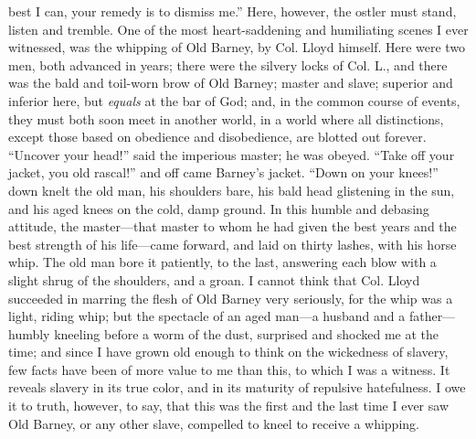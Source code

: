 best I can, your remedy is to dismiss me.'' Here, however, the ostler
must stand, listen and tremble. One of the most heart-saddening and
humiliating scenes I ever witnessed, was the whipping of Old Barney, by
Col. Lloyd himself. Here were two men, both advanced in years; there
were the silvery locks of Col. L., and there was the bald and toil-worn
brow of Old Barney; {\protect\hypertarget{114}{}{}}master and slave;
superior and inferior here, but \emph{equals} at the bar of God; and, in
the common course of events, they must both soon meet in another world,
in a world where all distinctions, except those based on obedience and
disobedience, are blotted out forever. ``Uncover your head!'' said the
imperious master; he was obeyed. ``Take off your jacket, you old
rascal!'' and off came Barney's jacket. ``Down on your knees!'' down
knelt the old man, his shoulders bare, his bald head glistening in the
sun, and his aged knees on the cold, damp ground. In this humble and
debasing attitude, the master---that master to whom he had given the
best years and the best strength of his life---came forward, and laid on
thirty lashes, with his horse whip. The old man bore it patiently, to
the last, answering each blow with a slight shrug of the shoulders, and
a groan. I cannot think that Col. Lloyd succeeded in marring the flesh
of Old Barney very seriously, for the whip was a light, riding whip; but
the spectacle of an aged man---a husband and a father---humbly kneeling
before a worm of the dust, surprised and shocked me at the time; and
since I have grown old enough to think on the wickedness of slavery, few
facts have been of more value to me than this, to which I was a witness.
It reveals slavery in its true color, and in its maturity of repulsive
hatefulness. I owe it to truth, however, to say, that this was the first
and the last time I ever saw Old Barney, or any other slave, compelled
to kneel to receive a whipping.

